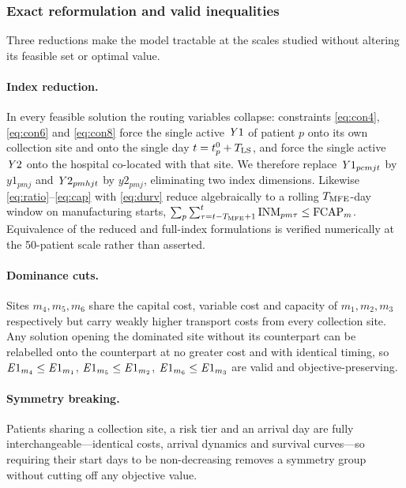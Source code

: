 \subsubsection{Exact reformulation and valid inequalities}

Three reductions make the model tractable at the scales studied without
altering its feasible set or optimal value.

\paragraph{Index reduction.} In every feasible solution the routing variables
collapse: constraints \eqref{eq:con4}, \eqref{eq:con6} and \eqref{eq:con8}
force the single active $\mathit{Y}1$ of patient $p$ onto its own collection site and
onto the single day $t = t^{0}_{p} + T_{\mathrm{LS}}$, and force the single active
$\mathit{Y}2$ onto the hospital co-located with that site. We therefore replace
$\mathit{Y}1_{pcmjt}$ by $y1_{pmj}$ and $\mathit{Y}2_{pmhjt}$ by $y2_{pmj}$, eliminating
two index dimensions. Likewise \eqref{eq:ratio}--\eqref{eq:cap} with
\eqref{eq:durv} reduce algebraically to a rolling $T_{\mathrm{MFE}}$-day window on
manufacturing starts, $\sum_{p} \sum_{\tau = t-T_{\mathrm{MFE}}+1}^{t} \mathrm{INM}_{pm\tau} \le
\mathrm{FCAP}_m$. Equivalence of the reduced and full-index formulations is verified
numerically at the 50-patient scale rather than asserted.

\paragraph{Dominance cuts.} Sites $m_4, m_5, m_6$ share the capital cost,
variable cost and capacity of $m_1, m_2, m_3$ respectively but carry weakly
higher transport costs from every collection site. Any solution opening the
dominated site without its counterpart can be relabelled onto the counterpart
at no greater cost and with identical timing, so $\mathit{E}1_{m_4} \le \mathit{E}1_{m_1}$,
$\mathit{E}1_{m_5} \le \mathit{E}1_{m_2}$, $\mathit{E}1_{m_6} \le \mathit{E}1_{m_3}$ are valid and
objective-preserving.

\paragraph{Symmetry breaking.} Patients sharing a collection site, a risk tier
and an arrival day are fully interchangeable---identical costs, arrival
dynamics and survival curves---so requiring their start days to be
non-decreasing removes a symmetry group without cutting off any objective
value.

